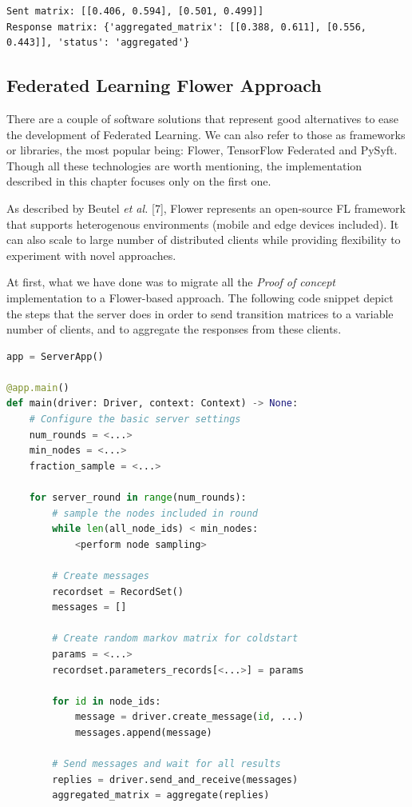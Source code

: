 \documentclass[conference]{IEEEtran}
\begin{document}
\begin{lstlisting}
Sent matrix: [[0.406, 0.594], [0.501, 0.499]]
Response matrix: {'aggregated_matrix': [[0.388, 0.611], [0.556, 0.443]], 'status': 'aggregated'}
\end{lstlisting}

\subsection{Federated Learning Flower Approach}

There are a couple of software solutions that represent good alternatives to ease the development of Federated Learning. We can also refer to those as frameworks or libraries, the most popular being: Flower, TensorFlow Federated and PySyft. Though all these technologies are worth mentioning, the implementation described in this chapter focuses only on the first one.

As described by Beutel \textit{et al.} [7], Flower represents an open-source FL framework that supports heterogenous environments (mobile and edge devices included). It can also scale to large number of distributed clients while providing flexibility to experiment with novel approaches.

At first, what we have done was to migrate all the \textit{Proof of concept} implementation to a Flower-based approach. The following code snippet depict the steps that the server does in order to send transition matrices to a variable number of clients, and to aggregate the responses from these clients.

\begin{lstlisting}[language=Python]
app = ServerApp()

@app.main()
def main(driver: Driver, context: Context) -> None:
    # Configure the basic server settings
    num_rounds = <...>
    min_nodes = <...>
    fraction_sample = <...>

    for server_round in range(num_rounds):
        # sample the nodes included in round
        while len(all_node_ids) < min_nodes:
            <perform node sampling>
            
        # Create messages
        recordset = RecordSet()
        messages = []

        # Create random markov matrix for coldstart
        params = <...>
        recordset.parameters_records[<...>] = params

        for id in node_ids:
            message = driver.create_message(id, ...)
            messages.append(message)

        # Send messages and wait for all results
        replies = driver.send_and_receive(messages)
        aggregated_matrix = aggregate(replies)
\end{lstlisting}
\end{document}
